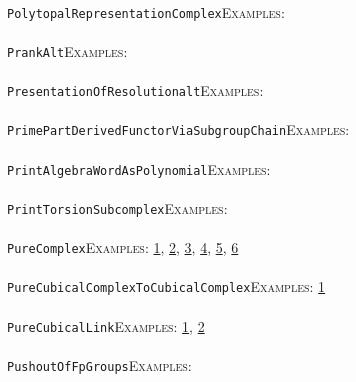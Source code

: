 \documentclass[a4paper,11pt]{report}
\begin{document}
{{ \\
 \texttt{PolytopalRepresentationComplex}{\nobreakspace}{\nobreakspace}{\nobreakspace}{\nobreakspace}\textsc{Examples:} \\
 \\
 \texttt{PrankAlt}{\nobreakspace}{\nobreakspace}{\nobreakspace}{\nobreakspace}\textsc{Examples:} \\
 \\
 \texttt{PresentationOfResolution{\textunderscore}alt}{\nobreakspace}{\nobreakspace}{\nobreakspace}{\nobreakspace}\textsc{Examples:} \\
 \\
 \texttt{PrimePartDerivedFunctorViaSubgroupChain}{\nobreakspace}{\nobreakspace}{\nobreakspace}{\nobreakspace}\textsc{Examples:} \\
 \\
 \texttt{PrintAlgebraWordAsPolynomial}{\nobreakspace}{\nobreakspace}{\nobreakspace}{\nobreakspace}\textsc{Examples:} \\
 \\
 \texttt{PrintTorsionSubcomplex}{\nobreakspace}{\nobreakspace}{\nobreakspace}{\nobreakspace}\textsc{Examples:} \\
 \\
 \texttt{PureComplex}{\nobreakspace}{\nobreakspace}{\nobreakspace}{\nobreakspace}\textsc{Examples:} \href{tutorial/chap2.html} {1}{\nobreakspace}, \href{tutorial/chap3.html} {2}{\nobreakspace}, \href{../www/SideLinks/About/aboutPeripheral.html} {3}{\nobreakspace}, \href{../www/SideLinks/About/aboutCoveringSpaces.html} {4}{\nobreakspace}, \href{../www/SideLinks/About/aboutCoverinSpaces.html} {5}{\nobreakspace}, \href{../www/SideLinks/About/aboutCubical.html} {6}{\nobreakspace} \\
 \\
 \texttt{PureCubicalComplexToCubicalComplex}{\nobreakspace}{\nobreakspace}{\nobreakspace}{\nobreakspace}\textsc{Examples:} \href{../www/SideLinks/About/aboutCubical.html} {1}{\nobreakspace} \\
 \\
 \texttt{PureCubicalLink}{\nobreakspace}{\nobreakspace}{\nobreakspace}{\nobreakspace}\textsc{Examples:} \href{tutorial/chap3.html} {1}{\nobreakspace}, \href{../www/SideLinks/About/aboutCoverinSpaces.html} {2}{\nobreakspace} \\
 \\
 \texttt{PushoutOfFpGroups}{\nobreakspace}{\nobreakspace}{\nobreakspace}{\nobreakspace}\textsc{Examples:} \\
 \\
}}
\end{document}
